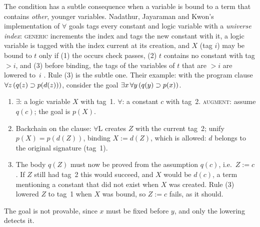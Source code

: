 {The condition has a subtle consequence when a variable is bound to a term that contains \emph{other},
younger variables. Nadathur, Jayaraman and Kwon's implementation of $\forall$ goals tags every constant and
logic variable with a \emph{universe index}: \textsc{generic} increments the index and tags the new
constant with it, a logic variable is tagged with the index current at its creation, and $X$ (tag $i$) may
be bound to $t$ only if (1) the occurs check passes, (2) $t$ contains no constant with tag $>i$, and (3)
before binding, the tags of the variables of $t$ that are $>i$ are lowered to~$i$
\cite{NadathurJayaramanKwon1995}. Rule (3) is the subtle one. Their example: with the program clause
$\forall z\,(q(z)\supset p(d(z)))$, consider the goal $\exists x\,\forall y\,(q(y)\supset p(x))$.
\begin{enumerate}
  \item $\exists$: a logic variable $X$ with tag~1. $\forall$: a constant $c$ with tag~2. \textsc{augment}:
        assume $q(c)$; the goal is $p(X)$.
  \item Backchain on the clause: $\forall$L creates $Z$ with the current tag~2; unify $p(X)=p(d(Z))$,
        binding $X:=d(Z)$, which is allowed: $d$ belongs to the original signature (tag~1).
  \item The body $q(Z)$ must now be proved from the assumption $q(c)$, i.e.\ $Z:=c$. If $Z$ still had tag~2
        this would succeed, and $X$ would be $d(c)$, a term mentioning a constant that did not exist when
        $X$ was created. Rule (3) lowered $Z$ to tag~1 when $X$ was bound, so $Z:=c$ fails, as it should.
\end{enumerate}
The goal is not provable, since $x$ must be fixed before $y$, and only the lowering detects it.

}
